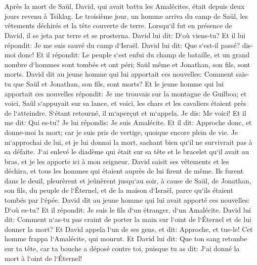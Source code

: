 

\chapter{}

\verse Après la mort de Saül, David, qui avait battu les Amalécites, était depuis deux jours revenu à Tsiklag. 
\verse Le troisième jour, un homme arriva du camp de Saül, les vêtements déchirés et la tête couverte de terre. Lorsqu`il fut en présence de David, il se jeta par terre et se prosterna. 
\verse David lui dit: D`où viens-tu? Et il lui répondit: Je me suis sauvé du camp d`Israël. 
\verse David lui dit: Que s`est-il passé? dis-moi donc! Et il répondit: Le peuple s`est enfui du champ de bataille, et un grand nombre d`hommes sont tombés et ont péri; Saül même et Jonathan, son fils, sont morts. 
\verse David dit au jeune homme qui lui apportait ces nouvelles: Comment sais-tu que Saül et Jonathan, son fils, sont morts? 
\verse Et le jeune homme qui lui apportait ces nouvelles répondit: Je me trouvais sur la montagne de Guilboa; et voici, Saül s`appuyait sur sa lance, et voici, les chars et les cavaliers étaient près de l`atteindre. 
\verse S`étant retourné, il m`aperçut et m`appela. Je dis: Me voici! 
\verse Et il me dit: Qui es-tu? Je lui répondis: Je suis Amalécite. 
\verse Et il dit: Approche donc, et donne-moi la mort; car je suis pris de vertige, quoique encore plein de vie. 
\verse Je m`approchai de lui, et je lui donnai la mort, sachant bien qu`il ne survivrait pas à sa défaite. J`ai enlevé le diadème qui était sur sa tête et le bracelet qu`il avait au bras, et je les apporte ici à mon seigneur. 
\verse David saisit ses vêtements et les déchira, et tous les hommes qui étaient auprès de lui firent de même. 
\verse Ils furent dans le deuil, pleurèrent et jeûnèrent jusqu`au soir, à cause de Saül, de Jonathan, son fils, du peuple de l`Éternel, et de la maison d`Israël, parce qu`ils étaient tombés par l`épée. 
\verse David dit au jeune homme qui lui avait apporté ces nouvelles: D`où es-tu? Et il répondit: Je suis le fils d`un étranger, d`un Amalécite. 
\verse David lui dit: Comment n`as-tu pas craint de porter la main sur l`oint de l`Éternel et de lui donner la mort? 
\verse Et David appela l`un de ses gens, et dit: Approche, et tue-le! Cet homme frappa l`Amalécite, qui mourut. 
\verse Et David lui dit: Que ton sang retombe sur ta tête, car ta bouche a déposé contre toi, puisque tu as dit: J`ai donné la mort à l`oint de l`Éternel! 
